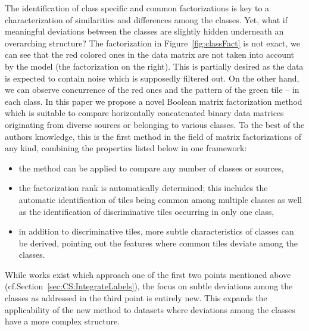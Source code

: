 The identification of class specific and common factorizations is key to a characterization of similarities and differences among the classes. Yet, what if meaningful deviations between the classes are slightly hidden underneath an overarching structure? The factorization in Figure~\ref{fig:classFact} is not exact, we can see that the red colored ones in the data matrix are not taken into account by the model (the factorization on the right). This is partially desired as the data is expected to contain noise which is supposedly filtered out. On the other hand, we can observe concurrence of the red ones and the pattern of the green tile -- in each class.
In this paper we propose a novel Boolean matrix factorization method which is suitable to compare horizontally concatenated binary data matrices originating from diverse sources or belonging to various classes. To the best of the authors knowledge, this is the first method in the field of matrix factorizations of any kind, combining the properties listed below in one framework:
\begin{itemize}
\item the method can be applied to compare any number of classes or sources,
\item the factorization rank is automatically determined; this includes the automatic identification of tiles being common among multiple classes as well as the identification of discriminative tiles occurring in only one class,
\item in addition to discriminative tiles, more subtle characteristics of classes can be derived, pointing out the features where common tiles deviate among the classes.
\end{itemize}
While works exist which approach one of the first two  points mentioned above (cf.\@ Section~\ref{sec:CS:IntegrateLabels}), the focus on subtle deviations among the classes as addressed in the third point is entirely new. This expands the applicability of the new method to datasets where deviations among the classes have a more complex structure.
